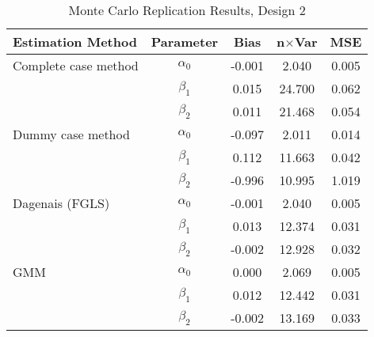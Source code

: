 \begin{table}
\centering
\caption{Monte Carlo Replication Results, Design 2}
\label{table:MCReplicationResultsDesign2}
\begin{tabular}{lcccc}
\toprule
Estimation Method & Parameter & Bias & n$\times$Var & MSE \\
\midrule
Complete case method & $\alpha_0$ & -0.001 & 2.040 & 0.005 \\
 & $\beta_1$ & 0.015 & 24.700 & 0.062 \\
 & $\beta_2$ & 0.011 & 21.468 & 0.054 \\
Dummy case method & $\alpha_0$ & -0.097 & 2.011 & 0.014 \\
 & $\beta_1$ & 0.112 & 11.663 & 0.042 \\
 & $\beta_2$ & -0.996 & 10.995 & 1.019 \\
Dagenais (FGLS) & $\alpha_0$ & -0.001 & 2.040 & 0.005 \\
 & $\beta_1$ & 0.013 & 12.374 & 0.031 \\
 & $\beta_2$ & -0.002 & 12.928 & 0.032 \\
GMM & $\alpha_0$ & 0.000 & 2.069 & 0.005 \\
 & $\beta_1$ & 0.012 & 12.442 & 0.031 \\
 & $\beta_2$ & -0.002 & 13.169 & 0.033 \\
\bottomrule
\end{tabular}
\end{table}
